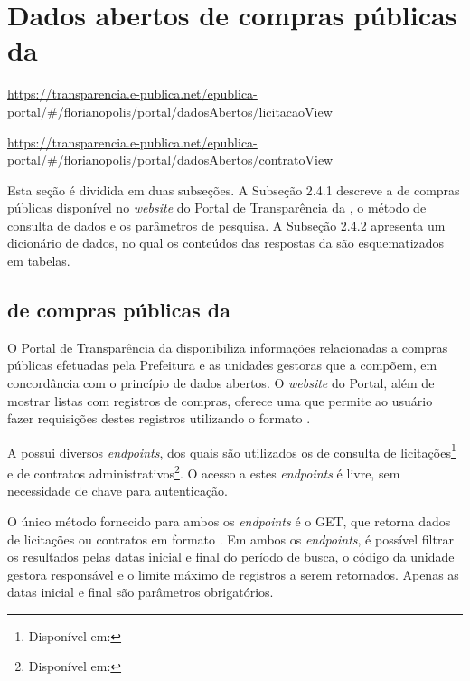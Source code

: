 \documentclass[
	12pt,				%
	oneside,			%
	a4paper,			%
	chapter=TITLE,		%
	section=TITLE,		%
	english,			%
	brazil				%
	]{abntex2}
\newcommand{\attention}[1]{{\color{red}\textbf{#1}}}
\begin{document}
\section{Dados abertos de compras públicas da }\label{sec:dados_abertos}

\urldef{\licitacoes}\url{https://transparencia.e-publica.net/epublica-portal/#/florianopolis/portal/dadosAbertos/licitacaoView}

\urldef{\contratos}\url{https://transparencia.e-publica.net/epublica-portal/#/florianopolis/portal/dadosAbertos/contratoView}

Esta seção é dividida em duas subseções. A Subseção 2.4.1 descreve a  de compras públicas disponível no \textit{website} do Portal de Transparência da , o método de consulta de dados e os parâmetros de pesquisa. A Subseção 2.4.2 apresenta um dicionário de dados, no qual os conteúdos das respostas da  são esquematizados em tabelas.

\subsection{ de compras públicas da }\label{ssec:api_compras_pmf}

O Portal de Transparência da  disponibiliza informações relacionadas a compras públicas efetuadas pela Prefeitura e as unidades gestoras que a compõem, em concordância com o princípio de dados abertos. O \textit{website} do Portal, além de mostrar listas com registros de compras, oferece uma   que permite ao usuário fazer requisições destes registros utilizando o formato .

A  possui diversos \textit{endpoints}, dos quais são utilizados os de consulta de licitações\footnote{Disponível em: \licitacoes} e de contratos administrativos\footnote{Disponível em: \contratos}. O acesso a estes \textit{endpoints} é livre, sem necessidade de chave para autenticação.

O único método fornecido para ambos os \textit{endpoints} é o GET, que retorna dados de licitações ou contratos em formato . Em ambos os \textit{endpoints}, é possível filtrar os resultados pelas datas inicial e final do período de busca, o código da unidade gestora responsável e o limite máximo de registros a serem retornados. Apenas as datas inicial e final são parâmetros obrigatórios.
\end{document}
